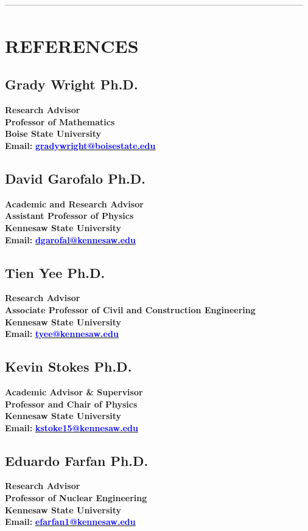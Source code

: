 \documentclass[margin, 10pt]{res} %
\begin{document}
\begin{resume}
---------------------------------------------------------------------------------------------------------

\section{REFERENCES}

\subsection{Grady Wright Ph.D.}
\textbf{Research Advisor} \\
\textbf{Professor of Mathematics} \\
\textbf{Boise State University} \\
\textbf{Email:} \href{mailto:gradywright@boisestate.edu}{\textcolor{blue}{\textbf{gradywright@boisestate.edu}}}

\subsection{David Garofalo Ph.D.}
\textbf{Academic and Research Advisor} \\
\textbf{Assistant Professor of Physics} \\
\textbf{Kennesaw State University} \\
\textbf{Email:} \href{mailto:dgarofal@kennesaw.edu}{\textcolor{blue}{\textbf{dgarofal@kennesaw.edu}}}

\subsection{Tien Yee Ph.D.}
\textbf{Research Advisor} \\
\textbf{Associate Professor of Civil and Construction Engineering} \\ 
\textbf{Kennesaw State University} \\
\textbf{Email:} \href{mailto:tyee@kennesaw.edu}{\textcolor{blue}{\textbf{tyee@kennesaw.edu}}}

\subsection{Kevin Stokes Ph.D.}
\textbf{Academic Advisor \& Supervisor} \\
\textbf{Professor and Chair of Physics} \\
\textbf{Kennesaw State University} \\
\textbf{Email:} \href{mailto:kstoke15@kennesaw.edu}{\textcolor{blue}{\textbf{kstoke15@kennesaw.edu}}}

\subsection{Eduardo Farfan Ph.D.}
\textbf{Research Advisor} \\
\textbf{Professor of Nuclear Engineering} \\
\textbf{Kennesaw State University} \\
\textbf{Email:} \href{mailto:efarfan1@kennesaw.edu}{\textcolor{blue}{\textbf{efarfan1@kennesaw.edu}}}

\end{resume}
\end{document}
